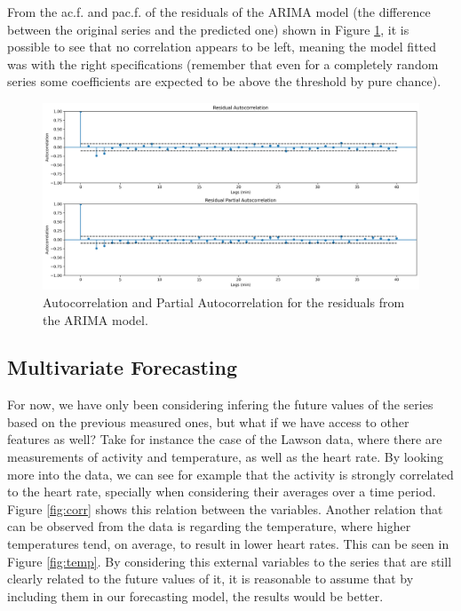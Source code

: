 \documentclass[../main.tex]{subfiles}
\begin{document}
        From the ac.f. and pac.f. of the residuals of the ARIMA model (the difference between the original series and the predicted one) shown in Figure \ref{fig:res_arima}, it is possible to see that no correlation appears to be left, meaning the model fitted was with the right specifications (remember that even for a completely random series some coefficients are expected to be above the threshold by pure chance).

        \begin{figure}[h]
            \begin{center}
            \centering
            \includegraphics[width={\columnwidth}]{images/res_ARIMA.png}
            \caption{Autocorrelation and Partial Autocorrelation for the residuals from the ARIMA model.}
            \label{fig:res_arima}
            \end{center}
        \end{figure}

    \subsection{Multivariate Forecasting}
        For now, we have only been considering infering the future values of the series based on the previous measured ones, but what if we have access to other features as well? Take for instance the case of the Lawson data, where there are measurements of activity and temperature, as well as the heart rate. By looking more into the data, we can see for example that the activity is strongly correlated to the heart rate, specially when considering their averages over a time period. Figure \ref{fig:corr} shows this relation between the variables. Another relation that can be observed from the data is regarding the temperature, where higher temperatures tend, on average, to result in lower heart rates. This can be seen in Figure \ref{fig:temp}. By considering this external variables to the series that are still clearly related to the future values of it, it is reasonable to assume that by including them in our forecasting model, the results would be better. \par
\end{document}
